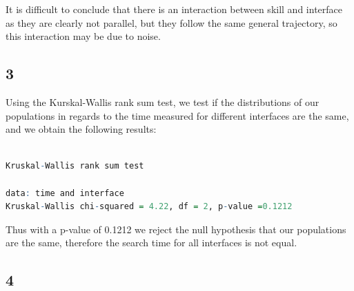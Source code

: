 \documentclass{article}
\begin{document}
	It is difficult to conclude that there is an interaction between skill and interface as they are clearly not parallel, but they follow the same general trajectory, so this interaction may be due to noise. 
    \subsection*{3}
    Using the Kurskal-Wallis rank sum test, we test if the distributions of our populations in regards to the time measured for different interfaces are the same, and we obtain the following results:\\\\
      \begin{lstlisting}[language=R]
Kruskal-Wallis rank sum test

data: time and interface
Kruskal-Wallis chi-squared = 4.22, df = 2, p-value =0.1212
      \end{lstlisting}
      Thus with a p-value of 0.1212 we reject the null hypothesis that our populations are the same, therefore the search time for all interfaces is not equal.
    \subsection*{4}
    
\end{document}

